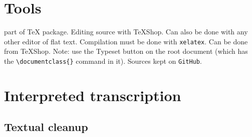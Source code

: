 \documentclass{report}
\begin{document}
\chapter{Tools}
\XeLaTeX{} part of \TeX{} package. Editing source with TeXShop. Can also
be done with any other editor of flat text. 
Compilation must be done with \texttt{xelatex}. Can be done from TeXShop.
Note: use the Typeset button on the root document
(which has the \verb;\documentclass{}; command in it).
Sources kept on \texttt{GitHub}.

\chapter{Interpreted transcription}
\section{Textual cleanup}
\end{document}
